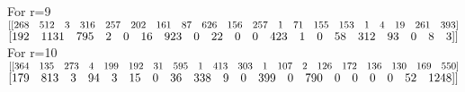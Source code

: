 \documentclass{article}
\begin{document}
For r=9\\
$[[ 268\quad  512  \quad  3 \quad 316\quad  257\quad  202\quad  161 \quad  87\quad  626 \quad 156 \quad257  \quad  1 \quad  71 \quad 155\quad 153 \quad   1  \quad  4 \quad  19\quad  261\quad  393]\\$
$[ 192\quad 1131 \quad 795 \quad   2 \quad   0 \quad  16\quad 923 \quad   0\quad   22 \quad   0 \quad   0 \quad 423\quad    1\quad    0\quad 58 \quad 312 \quad  93\quad    0 \quad   8  \quad  3]]\\$
For r=10\\
$[[ 364 \quad 135\quad  273\quad    4\quad  199 \quad192 \quad  31\quad  595  \quad  1\quad  413 \quad 303 \quad   1 \quad 107\quad    2 \quad126\quad  172\quad  136\quad  130 \quad 169 \quad 550]\\$
$[ 179 \quad 813\quad    3 \quad 94 \quad   3\quad   15 \quad   0\quad   36\quad  338 \quad   9 \quad   0\quad 399  \quad  0\quad 790\quad 0  \quad  0  \quad  0  \quad  0\quad   52 \quad1248]]\\$


\begin{figure}[h]
	\centering
	\qquad
	
	\centering
	\qquad
	
	\centering
\end{figure}
\vspace{4cm}
\end{document}
